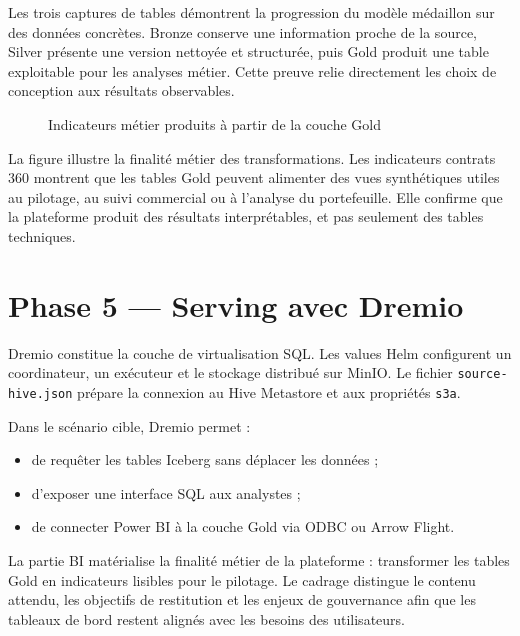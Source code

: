 Les trois captures de tables démontrent la progression du modèle médaillon sur des données concrètes. Bronze conserve une information proche de la source, Silver présente une version nettoyée et structurée, puis Gold produit une table exploitable pour les analyses métier. Cette preuve relie directement les choix de conception aux résultats observables.

\begin{figure}[H]
\centering
{}
\caption{Indicateurs métier produits à partir de la couche Gold}
\label{fig:realisation-kpis-contrats360}
\end{figure}

La figure illustre la finalité métier des transformations. Les indicateurs contrats 360 montrent que les tables Gold peuvent alimenter des vues synthétiques utiles au pilotage, au suivi commercial ou à l'analyse du portefeuille. Elle confirme que la plateforme produit des résultats interprétables, et pas seulement des tables techniques.

\section{Phase 5 — Serving avec Dremio}

Dremio constitue la couche de virtualisation SQL. Les values Helm configurent un coordinateur, un exécuteur et le stockage distribué sur MinIO. Le fichier \texttt{source-hive.json} prépare la connexion au Hive Metastore et aux propriétés \texttt{s3a}.

Dans le scénario cible, Dremio permet :
\begin{itemize}
    \item de requêter les tables Iceberg sans déplacer les données ;
    \item d'exposer une interface SQL aux analystes ;
    \item de connecter Power BI à la couche Gold via ODBC ou Arrow Flight.
\end{itemize}

La partie BI matérialise la finalité métier de la plateforme : transformer les tables Gold en indicateurs lisibles pour le pilotage. Le cadrage distingue le contenu attendu, les objectifs de restitution et les enjeux de gouvernance afin que les tableaux de bord restent alignés avec les besoins des utilisateurs.

